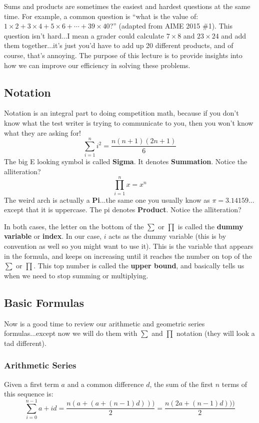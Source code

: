 Sums and products are sometimes the easiest and hardest questions at the same time. For example, a common question is ``what is the value of: $1\times2+3\times4+5\times6+\cdots+39\times40$?'' (adapted from AIME 2015 \#1). This question isn't hard...I mean a  grader could calculate $7\times8$ and $23\times24$ and add them together...it's just you'd have to add up 20 different products, and of course, that's annoying. The purpose of this lecture is to provide insights into how we can improve our efficiency in solving these problems.
	\subsection{Notation}
		Notation is an integral part to doing competition math, because if you don't know what the test writer is trying to communicate to you, then you won't know what they are asking for!
		$$\sum\limits_{i=1}^n i^2=\frac{n(n+1)(2n+1)}{6}$$
		The big E looking symbol is called \textbf{Sigma}. It denotes \textbf{Summation}. Notice the alliteration?
		$$\prod\limits_{i=1}^n x = x^n$$
		The weird arch is actually a \textbf{Pi}...the same one you usually know as $\pi = 3.14159...$ except that it is uppercase. The pi denotes \textbf{Product}. Notice the alliteration? \par
		In both cases, the letter on the bottom of the $\sum$ or $\prod$ is called the \textbf{dummy variable} or \textbf{index}. In our case, $i$ acts as the dummy variable (this is by convention as well so you might want to use it). This is the variable that appears in the formula, and keeps on increasing until it reaches the number on top of the $\sum$ or $\prod$. This top number is called the \textbf{upper bound}, and basically tells us when we need to stop summing or multiplying. \par
		
	\subsection{Basic Formulas}
	Now is a good time to review our arithmetic and geometric series formulas...except now we will do them with $\sum$ and $\prod$ notation (they will look a tad different). \par
	
		\subsubsection{Arithmetic Series} 
			Given a first term $a$ and a common difference $d$, the sum of the first $n$ terms of this sequence is:
			$$\sum\limits_{i=0}^{n-1} a+id= \frac{n(a+(a+(n-1)d)))}{2} = \frac{n(2a+(n-1)d)))}{2}$$
			
